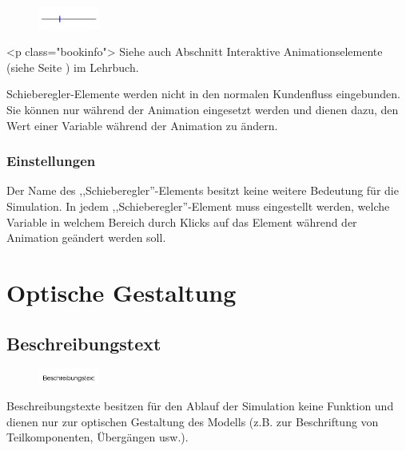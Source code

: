 \begin{figure}
\vspace{-22pt}
\includegraphics[width=2cm]{imageModelElementInteractiveSlider.png}
\vspace{-22pt}
\end{figure}

<p class="bookinfo">
Siehe auch Abschnitt Interaktive Animationselemente (siehe Seite \pageref{ref:book:8.12.4}) im Lehrbuch.

Schieberegler-Elemente werden nicht in den normalen Kundenfluss eingebunden.
Sie können nur während der Animation eingesetzt werden und dienen dazu,
den Wert einer Variable während der Animation zu ändern.

\subsection*{Einstellungen}

Der Name des ,,Schieberegler''-Elements besitzt keine weitere Bedeutung für die Simulation.
In jedem ,,Schieberegler''-Element muss eingestellt werden, welche Variable in welchem
Bereich durch Klicks auf das Element während der Animation geändert werden soll.





\chapter{Optische Gestaltung}

\section{Beschreibungstext}
\label{ref:ModelElementText}

\begin{figure}
\vspace{-22pt}
\includegraphics[width=2cm]{imageModelElementText.png}
\vspace{-22pt}
\end{figure}

Beschreibungstexte besitzen für den Ablauf der Simulation keine Funktion und dienen nur zur optischen Gestaltung des Modells
(z.B. zur Beschriftung von Teilkomponenten, Übergängen usw.).

